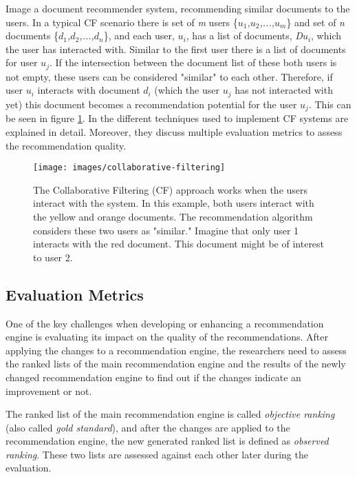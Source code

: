 Image a document recommender system, recommending similar documents to the users. In a typical CF scenario there is set of \emph{m} users \{\emph{$u_{1}$,$u_{2}$,...,$u_{m}$}\} and set of \emph{n} documents \{\emph{$d_{1}$,$d_{2}$,...,$d_{n}$}\}, and each user, \emph{$u_{i}$}, has a list of documents, \emph{D$u_{i}$}, which the user has interacted with. Similar to the first user there is a list of documents for user \emph{$u_{j}$}. If the intersection between the document list of these both users is not empty, these users can be considered "similar" to each other. Therefore, if user \emph{$u_{i}$} interacts with document \emph{$d_{i}$} (which the user \emph{$u_{j}$} has not interacted with yet) this document becomes a recommendation potential for the user \emph{$u_{j}$}. This can be seen in figure \ref{fig:collaborative-filtering}.
In \cite{suSurveyCollaborativeFiltering2009} the different techniques used to implement CF systems are explained in detail. Moreover, they discuss multiple evaluation metrics to assess the recommendation quality.


\begin{figure}[!htb]
    \centering
    \texttt{[image: images/collaborative-filtering]}
    \caption{The Collaborative Filtering (CF) approach works when the users interact with the system. In this example, both users interact with the yellow and orange documents. The recommendation algorithm considers these two users as "similar." Imagine that only user 1 interacts with the red document. This document might be of interest to user 2.}
    \label{fig:collaborative-filtering}
\end{figure}



\subsection{Evaluation Metrics}
\label{subsec:evaluation-metrics}
One of the key challenges when developing or enhancing a recommendation engine is evaluating its impact on the quality of the recommendations. After applying the changes to a recommendation engine, the researchers need to assess the ranked lists of the main recommendation engine and the results of the newly changed recommendation engine to find out if the changes indicate an improvement or not. 


The ranked list of the main recommendation engine is called \emph{objective ranking} (also called \emph{gold standard}), and after the changes are applied to the recommendation engine, the new generated ranked list is defined as \emph{observed ranking}. These two lists are assessed against each other later during the evaluation.


